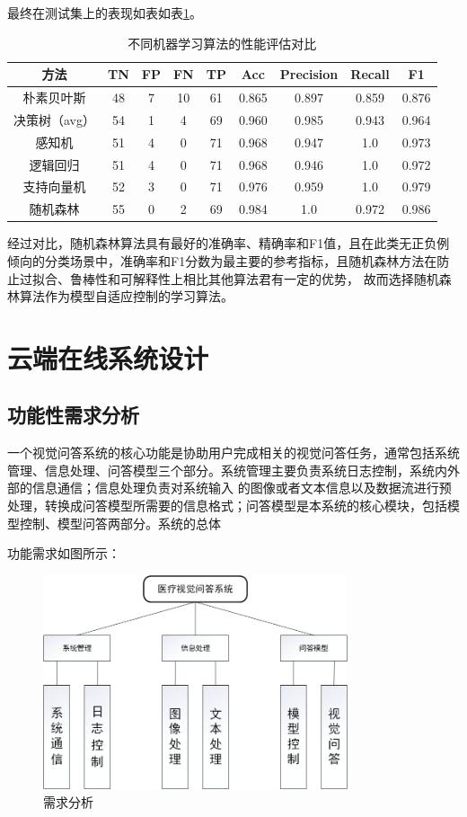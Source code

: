 最终在测试集上的表现如表如表\ref{tab:ML_compare}。
\begin{table}
	\caption{\label{tab:ML_compare}不同机器学习算法的性能评估对比}
	\centering
	\small
	\begin{tabular}{c|cccccccc}
		\hline  方法 & TN & FP & FN & TP & Acc & Precision & Recall & F1 \\
		\hline 朴素贝叶斯 & 48 & 7 & 10 & 61 & 0.865 & 0.897 & 0.859 & 0.876 \\
        决策树（avg） & 54 & 1 & 4 & 69 & 0.960 & 0.985 & 0.943 & 0.964 \\
        感知机 & 51 & 4 & 0 & 71 & 0.968 & 0.947 & 1.0 & 0.973 \\
        逻辑回归 & 51 & 4 & 0 & 71 & 0.968 & 0.946 & 1.0 & 0.972 \\
		支持向量机 & 52 & 3 & 0 & 71 & 0.976 & 0.959 & 1.0 & 0.979 \\
        随机森林 & 55 & 0 & 2 & 69 & 0.984 & 1.0 & 0.972 & 0.986 \\
		\hline
		\end{tabular}
\end{table}
经过对比，随机森林算法具有最好的准确率、精确率和F1值，且在此类无正负例倾向的分类场景中，准确率和F1分数为最主要的参考指标，且随机森林方法在防止过拟合、鲁棒性和可解释性上相比其他算法君有一定的优势\cite{}，
故而选择随机森林算法作为模型自适应控制的学习算法。

\section{云端在线系统设计}
\subsection{功能性需求分析}
一个视觉问答系统的核心功能是协助用户完成相关的视觉问答任务，通常包括系统管理、信息处理、问答模型三个部分。系统管理主要负责系统日志控制，系统内外部的信息通信；信息处理负责对系统输入
的图像或者文本信息以及数据流进行预处理，转换成问答模型所需要的信息格式；问答模型是本系统的核心模块，包括模型控制、模型问答两部分。系统的总体

功能需求如图所示：
\begin{figure}[htbp]
	\centering	
	\includegraphics[width=0.8\textwidth]{Fig/myfig/chapter5/sys_need.png}  %
	\caption{\label{sys_need}需求分析} 
\end{figure}

